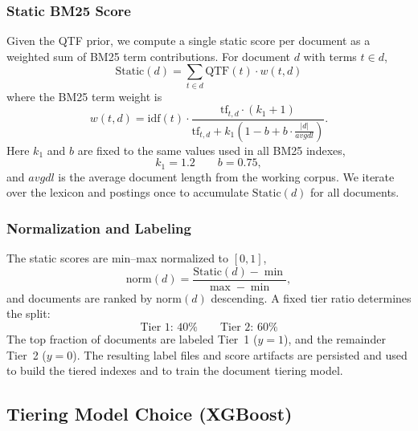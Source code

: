 \documentclass[11pt]{article}
\begin{document}
\subsubsection{Static BM25 Score}
Given the QTF prior, we compute a single static score per document as a weighted sum of BM25 term contributions. For document $d$ with terms $t \in d$,
\[
\text{Static}(d) = \sum_{t \in d} \text{QTF}(t) \cdot w(t, d)
\]
where the BM25 term weight is
\[
w(t, d) = \text{idf}(t) \cdot \frac{ \text{tf}_{t,d} \cdot (k_1 + 1)}{\text{tf}_{t,d} + k_1 \left(1 - b + b \cdot \frac{|d|}{\mathit{avgdl}}\right)}.
\]
Here $k_1$ and $b$ are fixed to the same values used in all BM25 indexes,
\[
k_1 = 1.2 \qquad b = 0.75,
\]
and $\mathit{avgdl}$ is the average document length from the working corpus. We iterate over the lexicon and postings once to accumulate $\text{Static}(d)$ for all documents.

\subsubsection{Normalization and Labeling}
The static scores are min–max normalized to $[0,1]$,
\[
\text{norm}(d) = \frac{\text{Static}(d) - \min}{\max - \min},
\]
and documents are ranked by $\text{norm}(d)$ descending. A fixed tier ratio determines the split:
\[
\text{Tier 1: }40\% \qquad \text{Tier 2: }60\%
\]
The top fraction of documents are labeled Tier~1 ($y=1$), and the remainder Tier~2 ($y=0$). The resulting label files and score artifacts are persisted and used to build the tiered indexes and to train the document tiering model.

\subsection{Tiering Model Choice (XGBoost)}
\end{document}
